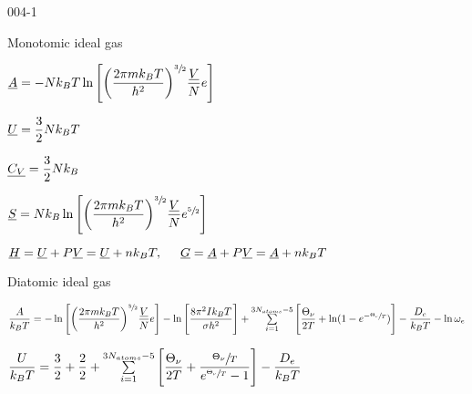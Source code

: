 \begin{mitframe}{004-1}

    
\begin{listone}
        
    \item Monotomic ideal gas 
    
    \item $\uline{\helmholtz} = -\nummoles\boltz\Temp\ln\Bigg[\bigg(\dfrac{2\pie\mass\boltz\Temp}{\planck^{2}}\bigg)^{\sfrac{3}{2}}\dfrac{\uline{\vol}}{\nummoles}e\Bigg]$
    
    
    \item $\uline{\intenergy}=\dfrac{3}{2}\nummoles\boltz\Temp$
    
    \item $\uline{\cv}=\dfrac{3}{2}\nummoles\boltz$
    
    
    \item $\uline{\entropy}=\nummoles\boltz\ln\Bigg[\bigg(\dfrac{2\pie\mass\boltz\Temp}{\planck^{2}}\bigg)^{\sfrac{3}{2}}\dfrac{\uline{\vol}}{\nummoles}e^{\sfrac{5}{2}}\Bigg]$
    
    
    \item $\uline{\enthalpy}=\uline{\intenergy}+\p\uline{\vol}=\uline{\intenergy}+n\boltz\Temp,\tab \uline{\gibbs}=\uline{\helmholtz}+\p\uline{\vol}=\uline{\helmholtz}+n\boltz\Temp$
    
    
    \item Diatomic ideal gas 
   
   	\item $\dfrac{\helmholtz}{\boltz\Temp}=-\ln\Bigg[\bigg(\dfrac{2\pie\mass\boltz\Temp}{\planck^{2}}\bigg)^{\sfrac{3}{2}}\dfrac{\uline{\vol}}{\nummoles}e\Bigg]-\ln\Bigg[\dfrac{8\pie^{2}\mominertia\boltz\Temp}{\molecrad\planck^{2}}\Bigg]+\sum\limits_{i=1}^{3\nummoles_{atoms}-5}\Bigg[\dfrac{\vibrfreqfac}{2\Temp}+\ln(1-e^{-\sfrac{\vibrfreqfac}{\Temp}})\Bigg]-\dfrac{\eneatom}{\boltz\Temp}-\ln\elecdegen$
    
    \item $\dfrac{\intenergy}{\boltz\Temp}=\dfrac{3}{2}+\dfrac{2}{2}+\sum\limits_{i=1}^{3\nummoles_{atoms}-5}\Bigg[\dfrac{\vibrfreqfac}{2\Temp}+\dfrac{\sfrac{\vibrfreqfac}{\Temp}}{e^{\sfrac{\vibrfreqfac}{\Temp}}-1}\Bigg]-\dfrac{\eneatom}{\boltz\Temp}$
    

\end{listone}
\end{mitframe}
